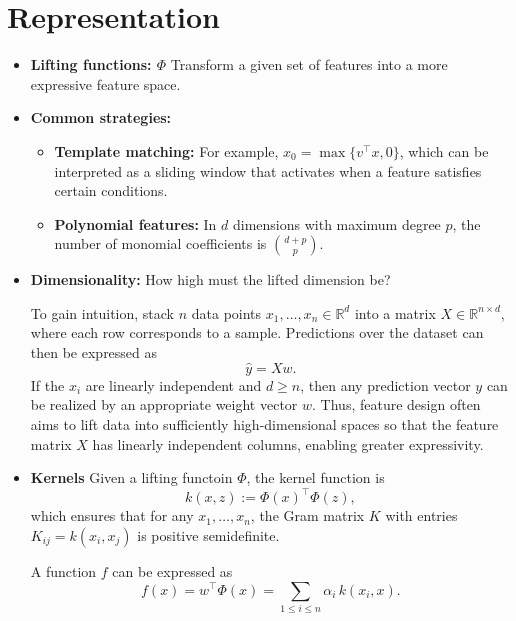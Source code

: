 \documentclass[a4paper]{article}
\begin{document}
\section{Representation}
\begin{itemize}
    \item \textbf{Lifting functions: $\Phi$} Transform a given set of features into a more expressive feature space.
    \item \textbf{Common strategies:}
    \begin{itemize}
        \item \textbf{Template matching:} For example, $x_0 = \max\{v^\top x, 0\}$, which can be interpreted as a sliding window that activates when a feature satisfies certain conditions.
        \item \textbf{Polynomial features:} In $d$ dimensions with maximum degree $p$, the number of monomial coefficients is $\binom{d+p}{p}$.
    \end{itemize}
    \item \textbf{Dimensionality:} How high must the lifted dimension be?  

    To gain intuition, stack $n$ data points $x_1, \ldots, x_n \in \mathbb{R}^d$ into a matrix $X \in \mathbb{R}^{n \times d}$, where each row corresponds to a sample. Predictions over the dataset can then be expressed as
    \[
    \hat{y} = Xw.
    \]
    If the $x_i$ are linearly independent and $d \geq n$, then any prediction vector $y$ can be realized by an appropriate weight vector $w$. Thus, feature design often aims to lift data into sufficiently high-dimensional spaces so that the feature matrix $X$ has linearly independent columns, enabling greater expressivity.

    \item \textbf{Kernels}
        Given a lifting functoin $\Phi$, the kernel function is
        \[
        k(x,z) := \Phi(x)^\top \Phi(z),
        \]
        which ensures that for any $x_1,\dots,x_n$, the Gram matrix $K$ with entries $K_{ij}=k(x_i,x_j)$ is positive semidefinite.

        A function $f$ can be expressed as
        \[
            f(x) = w^\top \Phi(x) = \sum_{1 \leq i \leq n} \alpha_i \, k(x_i, x).
        \]
\end{itemize}
\end{document}
